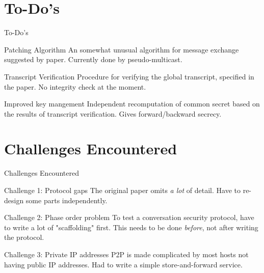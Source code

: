 \documentclass{beamer}
\begin{document}
\section{To-Do's}
\begin{frame}{To-Do's}
    \begin{block}{Patching Algorithm}
        An somewhat unusual algorithm for message exchange suggested by paper.
        Currently done by pseudo-multicast.
    \end{block}
    \begin{block}{Transcript Verification}
        Procedure for verifying the global transcript, specified in the paper.
        No integrity check at the moment.
    \end{block}
    \begin{block}{Improved key mangement}
        Independent recomputation of common secret based on the results of transcript
        verification. Gives forward/backward secrecy.
    \end{block}


\end{frame}

\section{Challenges Encountered}
\begin{frame}{Challenges Encountered}
    \pause
    \begin{block}{Challenge 1: Protocol gaps}
        The original paper omits \textit{a lot} of detail. Have to re-design some
        parts independently. 
    \end{block}
    \pause
    \begin{block}{Challenge 2: Phase order problem}
        To test a conversation security protocol, have to write a lot of "scaffolding" first. This needs to be done \textit{before}, not after writing the protocol.
    \end{block}
    \pause
    \begin{block}{Challenge 3: Private IP addresses}
        P2P is made complicated by most hosts not having public IP addresses.
        Had to write a simple store-and-forward service.
    \end{block}
\end{frame}
\end{document}
